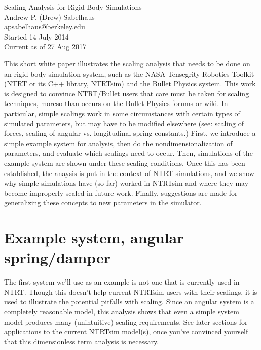 \documentclass[12pt,letterpaper]{article}
\begin{document}

\begin{center}
\huge
Scaling Analysis for Rigid Body Simulations\\
\normalsize
\vspace{0.1in}
Andrew P. (Drew) Sabelhaus\\
apsabelhaus@berkeley.edu \\
Started 14 July 2014 \\
Current as of 27 Aug 2017
\end{center}


This short white paper illustrates the scaling analysis that needs to be done on an rigid body simulation system, such as the NASA Tensegrity Robotics Toolkit (NTRT or its C++ library, NTRTsim) and the Bullet Physics system.
This work is designed to convince NTRT/Bullet users that care must be taken for scaling techniques, moreso than occurs on the Bullet Physics forums or wiki.
In particular, simple scalings work in some circumstances with certain types of simulated parameters, but may have to be modified elsewhere (see: scaling of forces, scaling of angular vs. longitudinal spring constants.)
First, we introduce a simple example system for analysis, then do the nondimensionalization of parameters, and evaluate which scalings need to occur.
Then, simulations of the example system are shown under these scaling conditions.
Once this has been established, the anaysis is put in the context of NTRT simulations, and we show why simple simulations have (so far) worked in NTRTsim and where they may become improperly scaled in future work.
Finally, suggestions are made for generalizing these concepts to new parameters in the simulator.

\section{Example system, angular spring/damper}

The first system we'll use as an example is not one that is currently used in NTRT.
Though this doesn't help current NTRTsim users with their scalings, it is used to illustrate the potential pitfalls with scaling.
Since an angular system is a completely reasonable model, this analysis shows that even a simple system model produces many (unintuitive) scaling requirements.
See later sections for applications to the current NTRTsim model(s), once you've convinced yourself that this dimensionless term analysis is necessary.
\end{document}
